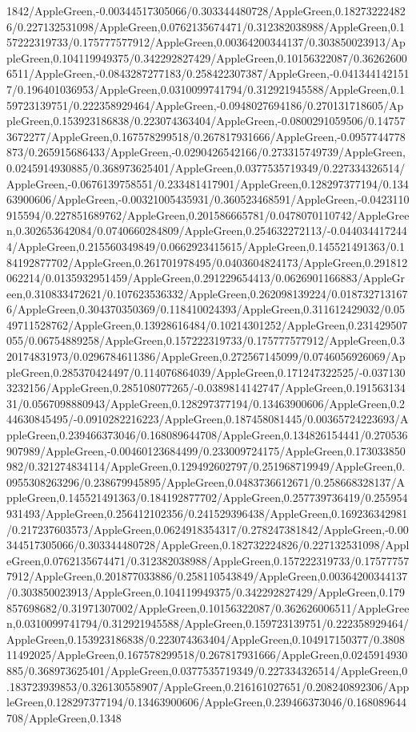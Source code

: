 {\begin{tikzternal}
{1842/AppleGreen,-0.00344517305066/0.303344480728/AppleGreen,0.182732224826/0.227132531098/AppleGreen,0.0762135674471/0.312382038988/AppleGreen,0.157222319733/0.175777577912/AppleGreen,0.00364200344137/0.303850023913/AppleGreen,0.104119949375/0.342292827429/AppleGreen,0.10156322087/0.362626006511/AppleGreen,-0.0843287277183/0.258422307387/AppleGreen,-0.0413441421517/0.196401036953/AppleGreen,0.0310099741794/0.312921945588/AppleGreen,0.159723139751/0.222358929464/AppleGreen,-0.0948027694186/0.270131718605/AppleGreen,0.153923186838/0.223074363404/AppleGreen,-0.0800291059506/0.147573672277/AppleGreen,0.167578299518/0.267817931666/AppleGreen,-0.0957744778873/0.265915686433/AppleGreen,-0.0290426542166/0.273315749739/AppleGreen,0.0245914930885/0.368973625401/AppleGreen,0.0377535719349/0.227334326514/AppleGreen,-0.0676139758551/0.233481417901/AppleGreen,0.128297377194/0.13463900606/AppleGreen,-0.00321005435931/0.360523468591/AppleGreen,-0.0423110915594/0.227851689762/AppleGreen,0.201586665781/0.0478070110742/AppleGreen,0.302653642084/0.0740660284809/AppleGreen,0.254632272113/-0.0440344172444/AppleGreen,0.215560349849/0.0662923415615/AppleGreen,0.145521491363/0.184192877702/AppleGreen,0.261701978495/0.0403604824173/AppleGreen,0.291812062214/0.0135932951459/AppleGreen,0.291229654413/0.0626901166883/AppleGreen,0.310833472621/0.107623536332/AppleGreen,0.262098139224/0.0187327131676/AppleGreen,0.304370350369/0.118410024393/AppleGreen,0.311612429032/0.0549711528762/AppleGreen,0.13928616484/0.10214301252/AppleGreen,0.231429507055/0.06754889258/AppleGreen,0.157222319733/0.175777577912/AppleGreen,0.320174831973/0.0296784611386/AppleGreen,0.272567145099/0.0746056926069/AppleGreen,0.285370424497/0.114076864039/AppleGreen,0.171247322525/-0.0371303232156/AppleGreen,0.285108077265/-0.0389814142747/AppleGreen,0.19156313431/0.0567098880943/AppleGreen,0.128297377194/0.13463900606/AppleGreen,0.244630845495/-0.0910282216223/AppleGreen,0.187458081445/0.00365724223693/AppleGreen,0.239466373046/0.168089644708/AppleGreen,0.134826154441/0.270536907989/AppleGreen,-0.00460123684499/0.233009724175/AppleGreen,0.173033850982/0.321274834114/AppleGreen,0.129492602797/0.251968719949/AppleGreen,0.0955308263296/0.238679945895/AppleGreen,0.0483736612671/0.258668328137/AppleGreen,0.145521491363/0.184192877702/AppleGreen,0.257739736419/0.255954931493/AppleGreen,0.256412102356/0.241529396438/AppleGreen,0.169236342981/0.217237603573/AppleGreen,0.0624918354317/0.278247381842/AppleGreen,-0.00344517305066/0.303344480728/AppleGreen,0.182732224826/0.227132531098/AppleGreen,0.0762135674471/0.312382038988/AppleGreen,0.157222319733/0.175777577912/AppleGreen,0.201877033886/0.258110543849/AppleGreen,0.00364200344137/0.303850023913/AppleGreen,0.104119949375/0.342292827429/AppleGreen,0.179857698682/0.31971307002/AppleGreen,0.10156322087/0.362626006511/AppleGreen,0.0310099741794/0.312921945588/AppleGreen,0.159723139751/0.222358929464/AppleGreen,0.153923186838/0.223074363404/AppleGreen,0.104917150377/0.380811492025/AppleGreen,0.167578299518/0.267817931666/AppleGreen,0.0245914930885/0.368973625401/AppleGreen,0.0377535719349/0.227334326514/AppleGreen,0.183723939853/0.326130558907/AppleGreen,0.216161027651/0.208240892306/AppleGreen,0.128297377194/0.13463900606/AppleGreen,0.239466373046/0.168089644708/AppleGreen,0.1348}
\end{tikzternal}}
